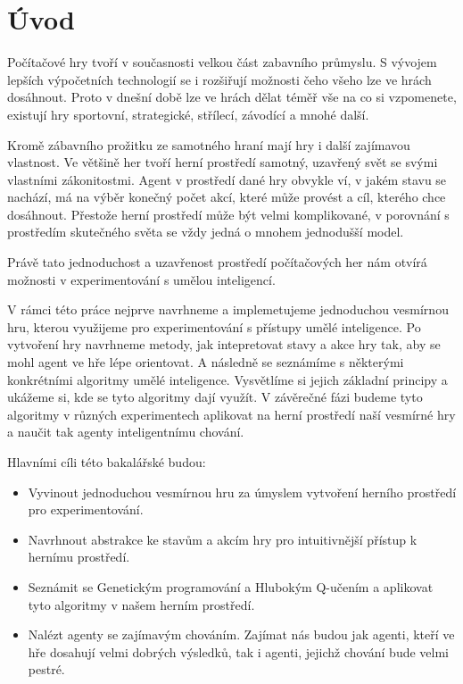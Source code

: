 \chapter*{Úvod}


Počítačové hry tvoří v současnosti velkou část zabavního průmyslu. S vývojem lepších výpočetních technologií se i rozšiřují možnosti čeho všeho lze ve hrách dosáhnout.
Proto v dnešní době lze ve hrách dělat téměř vše na co si vzpomenete, existují hry sportovní, strategické, střílecí, závodící a mnohé další.
\par
Kromě zábavního prožitku ze samotného hraní mají hry i další zajímavou vlastnost.
Ve většině her tvoří herní prostředí samotný, uzavřený svět se svými vlastními zákonitostmi.
Agent v prostředí dané hry obvykle ví, v jakém stavu se nachází, má na výběr konečný počet akcí, které může provést
a cíl, kterého chce dosáhnout.
Přestože herní prostředí může být velmi komplikované, v porovnání s prostředím skutečného světa se vždy jedná o mnohem jednodušší model.

\par
Právě tato jednoduchost a uzavřenost prostředí počítačových her nám otvírá možnosti v experimentování s umělou inteligencí.

\par
V rámci této práce nejprve navrhneme a implemetujeme jednoduchou vesmírnou hru, kterou využijeme pro experimentování s přístupy umělé inteligence.
Po vytvoření hry navrhneme metody, jak intepretovat stavy a akce hry tak, aby se mohl agent ve hře lépe orientovat.
A následně se seznámíme s některými konkrétními algoritmy umělé inteligence. Vysvětlíme si jejich základní principy a ukážeme si, kde se tyto algoritmy dají využít.
V závěrečné fázi budeme tyto algoritmy v různých experimentech aplikovat na herní prostředí naší vesmírné hry a naučit tak agenty inteligentnímu chování.

Hlavními cíli této bakalářské budou:
\begin{itemize}
    \item Vyvinout jednoduchou vesmírnou hru za úmyslem vytvoření herního prostředí pro experimentování.
    \item Navrhnout abstrakce ke stavům a akcím hry pro intuitivnější přístup k hernímu prostředí.
    \item Seznámit se Genetickým programování a Hlubokým Q-učením a aplikovat tyto algoritmy v našem herním prostředí.
    \item Nalézt agenty se zajímavým chováním. Zajímat nás budou jak agenti, kteří ve hře dosahují velmi dobrých výsledků, tak i agenti, jejichž chování bude velmi pestré.
\end{itemize}



